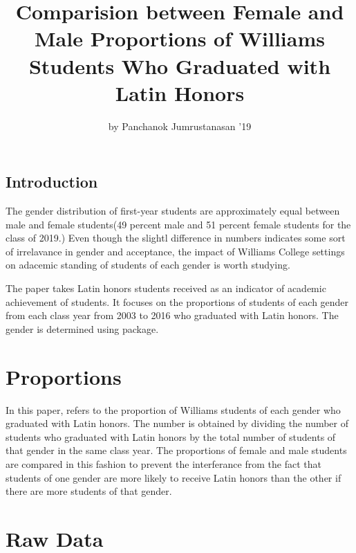 \title{Comparision between Female and Male Proportions of Williams Students Who
Graduated with Latin Honors}
\author{by Panchanok Jumrustanasan '19}

\maketitle


\subsection{Introduction}\label{introduction}

The gender distribution of first-year students are approximately equal
between male and female students(49 percent male and 51 percent female
students for the class of 2019.) Even though the slightl difference in
numbers indicates some sort of irrelavance in gender and acceptance, the
impact of Williams College settings on adacemic standing of students of
each gender is worth studying.

The paper takes Latin honors students received as an indicator of
academic achievement of students. It focuses on the proportions of
students of each gender from each class year from 2003 to 2016 who
graduated with Latin honors. The gender is determined using 
package\citep{genderpkg}.

\section{Proportions}\label{proportions}

In this paper,  refers to the proportion of Williams
students of each gender who graduated with Latin honors. The number is
obtained by dividing the number of students who graduated with Latin
honors by the total number of students of that gender in the same class
year. The proportions of female and male students are compared in this
fashion to prevent the interferance from the fact that students of one
gender are more likely to receive Latin honors than the other if there
are more students of that gender.

\section{Raw Data}\label{raw-data}

